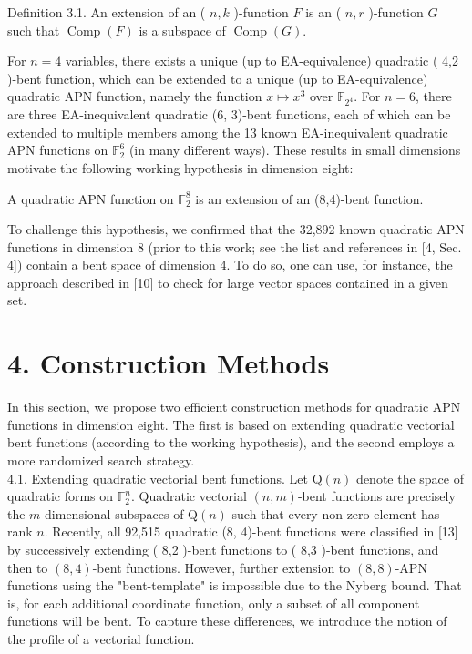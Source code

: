 \documentclass[10pt]{article}
\begin{document}
Definition 3.1. An extension of an ( $n, k$ )-function $F$ is an ( $n, r$ )-function $G$ such that $\operatorname{Comp}(F)$ is a subspace of $\operatorname{Comp}(G)$.

For $n=4$ variables, there exists a unique (up to EA-equivalence) quadratic ( 4,2 )-bent function, which can be extended to a unique (up to EA-equivalence) quadratic APN function, namely the function $x \mapsto x^{3}$ over $\mathbb{F}_{2^{4}}$. For $n=6$, there are three EA-inequivalent quadratic (6, 3)-bent functions, each of which can be extended to multiple members among the 13 known EA-inequivalent quadratic APN functions on $\mathbb{F}_{2}^{6}$ (in many different ways). These results in small dimensions motivate the following working hypothesis in dimension eight:

\begin{displayquote}
A quadratic APN function on $\mathbb{F}_{2}^{8}$ is an extension of an (8,4)-bent function.
\end{displayquote}

To challenge this hypothesis, we confirmed that the 32,892 known quadratic APN functions in dimension 8 (prior to this work; see the list and references in [4, Sec. 4]) contain a bent space of dimension 4. To do so, one can use, for instance, the approach described in [10] to check for large vector spaces contained in a given set.

\section*{4. Construction Methods}
In this section, we propose two efficient construction methods for quadratic APN functions in dimension eight. The first is based on extending quadratic vectorial bent functions (according to the working hypothesis), and the second employs a more randomized search strategy.\\
4.1. Extending quadratic vectorial bent functions. Let $\mathrm{Q}(n)$ denote the space of quadratic forms on $\mathbb{F}_{2}^{n}$. Quadratic vectorial $(n, m)$-bent functions are precisely the $m$-dimensional subspaces of $\mathrm{Q}(n)$ such that every non-zero element has rank $n$. Recently, all 92,515 quadratic (8, 4)-bent functions were classified in [13] by successively extending ( 8,2 )-bent functions to ( 8,3 )-bent functions, and then to $(8,4)$-bent functions. However, further extension to $(8,8)$-APN functions using the "bent-template" is impossible due to the Nyberg bound. That is, for each additional coordinate function, only a subset of all component functions will be bent. To capture these differences, we introduce the notion of the profile of a vectorial function.
\end{document}
